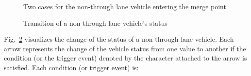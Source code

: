 \documentclass[10pt, conference, compsocconf]{IEEEtran}
\begin{document}
\begin{figure}[h]
	\begin{center}
	\end{center}
	\caption{Two cases for the non-through lane vehicle entering the merge point}
	\label{space}
\end{figure}

\begin{figure}[h]
\begin{center}
\end{center}
\caption{Transition of a non-through lane vehicle's status}
\label{nonThroughLaneStatus}
\end{figure}

Fig.~\ref{nonThroughLaneStatus} visualizes the change of the status
of a non-through lane vehicle.  Each arrow represents the change of the
vehicle status from one value to another if the condition (or the
trigger event) denoted by the character attached to the arrow is
satisfied.  Each condition (or trigger event) is:
\end{document}
